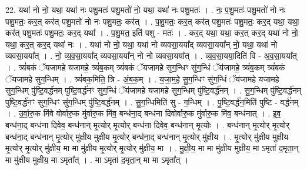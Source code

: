 \documentclass[17pt]{extarticle}
\begin{document}
22. यथा॑ नो नो॒ यथा॒ यथा॑ नः पशु॒मतः॑ पशु॒मतो॑ नो॒ यथा॒ यथा॑ नः पशु॒मतः॑ । . नः॒ प॒शु॒मतः॑ पशु॒मतो॑ नो नः पशु॒मतः॒ कर॒त् कर॑त् पशु॒मतो॑ नो नः पशु॒मतः॒ कर॑त् । . प॒शु॒मतः॒ कर॒त् कर॑त् पशु॒मतः॑ पशु॒मतः॒ कर॒द् यथा॒ यथा॒ कर॑त् पशु॒मतः॑ पशु॒मतः॒ कर॒द् यथा᳚ । . प॒शु॒मत॒ इति॑ पशु - मतः॑ । . कर॒द् यथा॒ यथा॒ कर॒त् कर॒द् यथा॑ नो नो॒ यथा॒ कर॒त् कर॒द् यथा॑ नः । . यथा॑ नो नो॒ यथा॒ यथा॑ नो व्यवसा॒यया᳚द् व्यवसा॒यया᳚न् नो॒ यथा॒ यथा॑ नो व्यवसा॒यया᳚त् । . नो॒ व्य॒व॒सा॒यया᳚द् व्यवसा॒यया᳚न् नो नो व्यवसा॒यया᳚त् । . व्य॒व॒सा॒यया॒दिति॑ वि - अ॒व॒सा॒यया᳚त् । . त्र्यं॑बकं ॅयजामहे यजामहे॒ त्र्यं॑ब॒कम् त्र्यं॑बकं ॅयजामहे सुग॒न्धिꣳ सु॑ग॒न्धिं ॅय॑जामहे॒ त्र्यं॑ब॒कम् त्र्यं॑बकं ॅयजामहे सुग॒न्धिम् । . त्र्यं॑बक॒मिति॒ त्रि - अं॒ब॒क॒म् । . य॒जा॒म॒हे॒ सु॒ग॒न्धिꣳ सु॑ग॒न्धिं ॅय॑जामहे यजामहे सुग॒न्धिम् पु॑ष्टि॒वर्द्ध॑नम् पुष्टि॒वर्द्ध॑नꣳ सुग॒न्धिं ॅय॑जामहे यजामहे सुग॒न्धिम् पु॑ष्टि॒वर्द्ध॑नम् । . सु॒ग॒न्धिम् पु॑ष्टि॒वर्द्ध॑नम् पुष्टि॒वर्द्ध॑नꣳ सुग॒न्धिꣳ सु॑ग॒न्धिम् पु॑ष्टि॒वर्द्ध॑नम् । . सु॒ग॒न्धिमिति॑ सु - ग॒न्धिम् । . पु॒ष्टि॒वर्द्ध॑न॒मिति॑ पुष्टि - वर्द्ध॑नम् । . उ॒र्वा॒रु॒क मि॑वे वोर्वारु॒क मु॑र्वारु॒क मि॑व॒ बन्ध॑ना॒द् बन्ध॑ना दिवोर्वारु॒क मु॑र्वारु॒क मि॑व॒ बन्ध॑नात् । . इ॒व॒ बन्ध॑ना॒द् बन्ध॑ना दिवेव॒ बन्ध॑नान् मृ॒त्योर् मृ॒त्योर् बन्ध॑ना दिवेव॒ बन्ध॑नान् मृ॒त्योः । . बन्ध॑नान् मृ॒त्योर् मृ॒त्योर् बन्ध॑ना॒द् बन्ध॑नान् मृ॒त्योर् मु॑क्षीय मुक्षीय मृ॒त्योर् बन्ध॑ना॒द् बन्ध॑नान् मृ॒त्योर् मु॑क्षीय । . मृ॒त्योर् मु॑क्षीय मुक्षीय मृ॒त्योर् मृ॒त्योर् मु॑क्षीय॒ मा मा मु॑क्षीय मृ॒त्योर् मृ॒त्योर् मु॑क्षीय॒ मा । . मु॒क्षी॒य॒ मा मा मु॑क्षीय मुक्षीय॒ मा ऽमृता॑ द॒मृता॒न् मा मु॑क्षीय मुक्षीय॒ मा ऽमृता᳚त् । . मा ऽमृता॑ द॒मृता॒न् मा मा ऽमृता᳚त् । \newline
\end{document}
